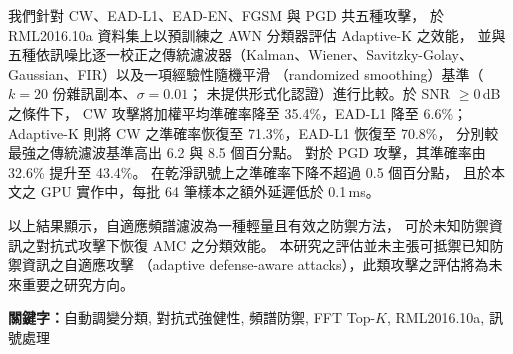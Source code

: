 我們針對 CW、EAD-L1、EAD-EN、FGSM 與 PGD 共五種攻擊，
於 RML2016.10a 資料集上以預訓練之 AWN 分類器評估 Adaptive-K 之效能，
並與五種依訊噪比逐一校正之傳統濾波器（Kalman、Wiener、Savitzky-Golay、
Gaussian、FIR）以及一項經驗性隨機平滑
（randomized smoothing）基準（$k = 20$ 份雜訊副本、$\sigma = 0.01$；
未提供形式化認證）進行比較。於 SNR $\geq 0$\,dB 之條件下，
CW 攻擊將加權平均準確率降至 35.4\%，EAD-L1 降至 6.6\%；
Adaptive-K 則將 CW 之準確率恢復至 71.3\%，EAD-L1 恢復至 70.8\%，
分別較最強之傳統濾波基準高出 6.2 與 8.5 個百分點。
對於 PGD 攻擊，其準確率由 32.6\% 提升至 43.4\%。
在乾淨訊號上之準確率下降不超過 0.5 個百分點，
且於本文之 GPU 實作中，每批 64 筆樣本之額外延遲低於 0.1\,ms。

以上結果顯示，自適應頻譜濾波為一種輕量且有效之防禦方法，
可於未知防禦資訊之對抗式攻擊下恢復 AMC 之分類效能。
本研究之評估並未主張可抵禦已知防禦資訊之自適應攻擊
（adaptive defense-aware attacks），此類攻擊之評估將為未來重要之研究方向。

\vspace{1cm}

\textbf{關鍵字：}自動調變分類, 對抗式強健性, 頻譜防禦, FFT Top-$K$, RML2016.10a, 訊號處理
